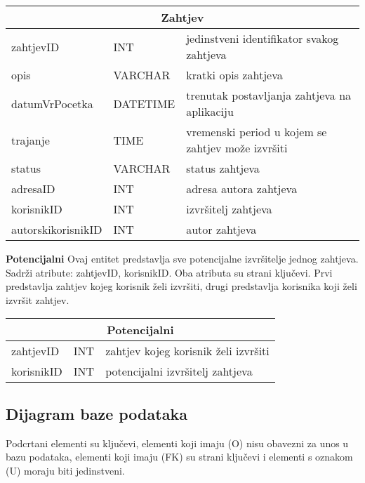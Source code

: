 			\begin{tabularx} {\textwidth} {|p{3.5cm}|p{2cm}|X|}
				
				\hline
				\multicolumn{3}{|c|}{\textbf{Zahtjev}} \\
				\hline
				
				\cellcolor{LightGreen}zahtjevID & INT	& jedinstveni identifikator svakog zahtjeva	\\ \hline
				opis	& VARCHAR &  kratki opis zahtjeva 	\\ \hline 
				datumVrPocetka & DATETIME &  trenutak postavljanja zahtjeva na aplikaciju \\ \hline 
				trajanje & TIME	&  vremenski period u kojem se zahtjev može izvršiti		\\ \hline 
				status & VARCHAR & status zahtjeva  \\ \hline
				\cellcolor{LightBlue} adresaID	& INT &  adresa autora zahtjeva 	\\ \hline 
				\cellcolor{LightBlue} korisnikID	& INT &  izvršitelj zahtjeva 	\\ \hline
				\cellcolor{LightBlue} autorskikorisnikID	& INT &   autor zahtjeva	\\ \hline
				
				
			\end{tabularx}
			
			\bigskip
			\bigskip
			\textbf{Potencijalni} Ovaj entitet predstavlja sve potencijalne izvršitelje jednog zahtjeva. Sadrži atribute: zahtjevID, korisnikID. Oba atributa su strani ključevi. Prvi predstavlja zahtjev kojeg korisnik želi izvršiti, drugi predstavlja korisnika koji želi izvršit zahtjev.
			\bigskip
			
			\begin{tabularx}{\textwidth} {|p{2cm}|p{2cm}|X|}
				\hline
				\multicolumn{3}{|c|}{\textbf{Potencijalni}} \\
				\hline
				\cellcolor{LightGreen} zahtjevID & INT & zahtjev kojeg korisnik želi izvršiti \\
				\hline
				\cellcolor{LightGreen} korisnikID & INT & potencijalni izvršitelj zahtjeva \\
				\hline
			\end{tabularx}
			
			
			
			\newpage
			\subsection{Dijagram baze podataka}
			Podcrtani elementi su ključevi, elementi koji imaju (O) nisu obavezni za unos u bazu podataka, elementi koji imaju (FK) su strani ključevi i elementi s oznakom (U) moraju biti jedinstveni.
			

